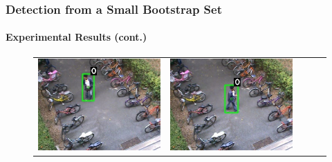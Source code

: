 \begin{frame}
    \frametitle{Detection from a Small Bootstrap Set}
    \framesubtitle{Experimental Results (cont.)}

    \begin{figure}[t]
        \centering
        \begin{tabular}{ccccc}
            \includegraphics[scale=0.17]{figures/case-1-suspicious-0187} &
            \includegraphics[scale=0.17]{figures/case-1-suspicious-0208} &

\end{tabular}
\end{figure}
\end{frame}
